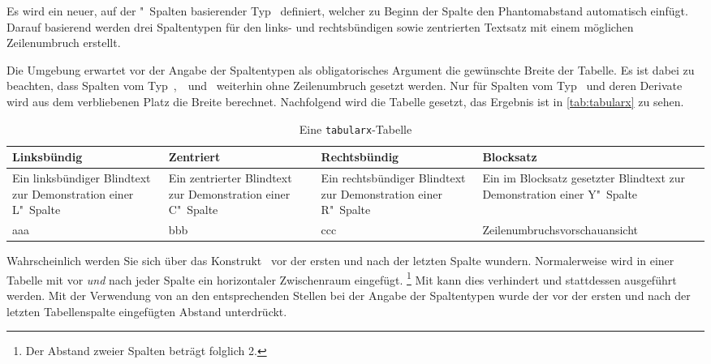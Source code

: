\documentclass[%
  english,ngerman,%
  geometry=no,DIV=12,automark,%
]{tudscrartcl}
\begin{document}
Es wird ein neuer, auf der "~Spalten basierender Typ~ 
definiert, welcher zu Beginn der Spalte den Phantomabstand automatisch einfügt. 
Darauf basierend werden drei Spaltentypen für den links- und rechtsbündigen 
sowie zentrierten Textsatz mit einem möglichen Zeilenumbruch erstellt.
%
\InputHook{\renewcommand*{\newcolumntype}[2]{}}
\begin{Excerpt}
\end{Excerpt}
%
Die Umgebung  erwartet vor der Angabe der Spaltentypen 
als obligatorisches Argument die gewünschte Breite der Tabelle. Es ist dabei zu 
beachten, dass Spalten vom Typ~,~~und~ weiterhin 
ohne Zeilenumbruch gesetzt werden. Nur für Spalten vom Typ~ und deren 
Derivate wird aus dem verbliebenen Platz die Breite berechnet. Nachfolgend wird 
die Tabelle gesetzt, das Ergebnis ist in \autoref{tab:tabularx} zu sehen.
%
\begin{Excerpt*}
\begin{table}
\begin{tabularx}{\textwidth}{@{}LCRY@{}}
\toprule
\textbf{Linksbündig} & \textbf{Zentriert} & 
\textbf{Rechtsbündig} & \textbf{Blocksatz} \tabularnewline
\midrule
Ein linksbündiger Blindtext zur Demonstration einer L"~Spalte &
Ein zentrierter Blindtext zur Demonstration einer C"~Spalte &
Ein rechtsbündiger Blindtext zur Demonstration einer R"~Spalte &
Ein im Blocksatz gesetzter Blindtext zur Demonstration einer Y"~Spalte
\tabularnewline
aaa & bbb & ccc & Zeilenumbruchsvorschauansicht\tabularnewline
\bottomrule
\end{tabularx}
\caption{Eine \texttt{tabularx}-Tabelle}\label{tab:tabularx}
\end{table}
\end{Excerpt*}
\InputExcerpt
%
Wahrscheinlich werden Sie sich über das Konstrukt~ vor der ersten 
und nach der letzten Spalte wundern. Normalerweise wird in einer Tabelle mit 
 vor \emph{und} nach jeder Spalte ein 
horizontaler Zwischenraum eingefügt.%
\footnote{Der Abstand zweier Spalten beträgt folglich 2.}
Mit  kann dies verhindert und stattdessen  
 ausgeführt werden. Mit der Verwendung von  
an den entsprechenden Stellen bei der Angabe der Spaltentypen wurde der vor der 
ersten und nach der letzten Tabellenspalte eingefügten Abstand unterdrückt.
\end{document}
